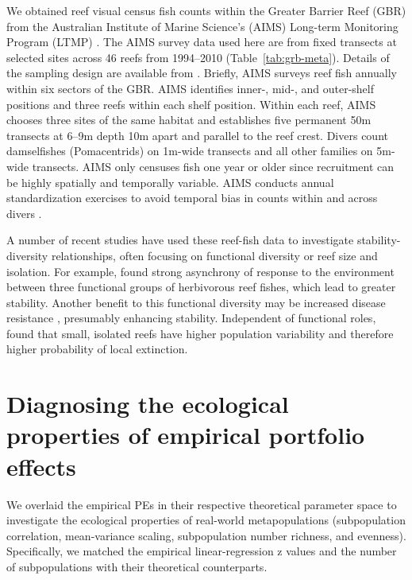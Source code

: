 We obtained reef visual census fish counts within the Greater Barrier Reef
(GBR) from the Australian Institute of Marine Science's (AIMS) Long-term
Monitoring Program (LTMP) \citep{sweatman2008}. The AIMS survey data used
here are from fixed transects at selected sites across 46 reefs from
1994--2010 (Table~\ref{tab:grb-meta}). Details of the sampling design are
available from \citet{halford1994}. Briefly, AIMS surveys reef fish
annually within six sectors of the GBR. AIMS identifies inner-, \mbox{mid-,}
and outer-shelf positions and three reefs within each shelf position. Within
each reef, AIMS chooses three sites of the same habitat and establishes five
permanent 50m transects at 6--9m depth 10m apart and parallel to the reef
crest. Divers count damselfishes (Pomacentrids) on 1m-wide transects and all
other families on 5m-wide transects. AIMS only censuses fish one year or older
since recruitment can be highly spatially and temporally variable. AIMS
conducts annual standardization exercises to avoid temporal bias in counts
within and across divers \citep{halford1994}.

A number of recent studies have used these reef-fish data to
investigate stability-diversity relationships, often focusing on functional
diversity or reef size and isolation. For example, \citet{thibaut2012}
found strong asynchrony of response to the environment between three functional
groups of herbivorous reef fishes, which lead to greater stability. Another
benefit to this functional diversity may be increased disease resistance
\citep{raymundo2009}, presumably enhancing stability. Independent of
functional roles, \citet{mellin2010} found that small, isolated reefs have
higher population variability and therefore higher probability of local
extinction.

\section{Diagnosing the ecological properties of empirical portfolio effects}

We overlaid the empirical PEs in their respective theoretical parameter space
to investigate the ecological properties of real-world metapopulations
(subpopulation correlation, mean-variance scaling, subpopulation number
richness, and evenness). Specifically, we matched the empirical
linear-regression z values and the number of subpopulations with their
theoretical counterparts.

